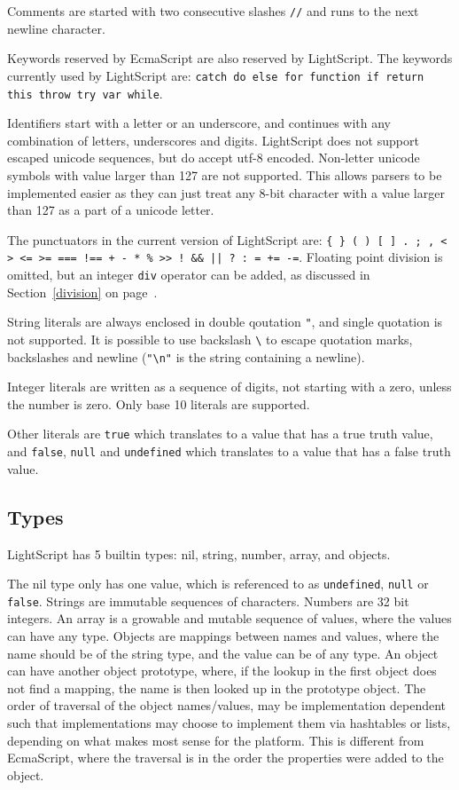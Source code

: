 \documentclass[11pt]{report}
\begin{document}
Comments are started with two consecutive slashes \verb|//| and runs to the next newline character.

Keywords reserved by EcmaScript are also reserved by LightScript. The keywords currently used by LightScript are: {\tt catch do else for function if return this throw try var while}. 

Identifiers start with a letter or an underscore, and continues with any combination of letters, underscores and digits. 
LightScript does not support escaped unicode sequences, but do accept utf-8 encoded. Non-letter unicode symbols with value larger than 127 are not supported. This allows parsers to be implemented easier as they can just treat any 8-bit character with a value larger than 127 as a part of a unicode letter.

The punctuators in the current version of LightScript are: {\tt \verb|{| \verb|}| ( ) [ ] . ; , < > <= >= === !== + - * \% >> ! \&\& || ? : = += -=}. 
Floating point division is omitted, but an integer \verb|div| operator can be added, as discussed in Section~\ref{division} on page~\pageref{division}.

String literals are always enclosed in double qoutation \verb|"|, and single quotation is not supported. It is possible to use backslash \verb|\| to escape quotation marks, backslashes and newline (\verb|"\n"| is the string containing a newline).

Integer literals are written as a sequence of digits, not starting with a zero, unless the number is zero. Only base 10 literals are supported.

Other literals are \verb|true| which translates to a value that has a true truth value, and \verb|false|, \verb|null| and \verb|undefined| which translates to a value that has a false truth value.

\subsection{Types}
LightScript has 5 builtin types: nil, string, number, array, and objects.

The nil type only has one value, which is referenced to as \verb|undefined|, \verb|null| or \verb|false|. 
Strings are immutable sequences of characters.
Numbers are 32 bit integers.
An array is a growable and mutable sequence of values, where the values can have any type.
Objects are mappings between names and values, where the name should be of the string type, and the value can be of any type. An object can have another object prototype, where, if the lookup in the first object does not find a mapping, the name is then looked up in the prototype object.
The order of traversal of the object names/values, may be implementation dependent such that implementations may choose to implement them via hashtables or lists, depending on what makes most sense for the platform. This is different from EcmaScript, where the traversal is in the order the properties were added to the object.
\end{document}
